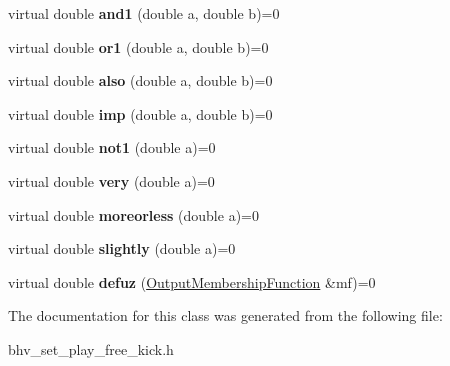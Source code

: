 \begin{DoxyCompactItemize}
\item 
\hypertarget{classOperatorset_a19f3335754a251731b307cd02f7c9a40}{
virtual double {\bfseries and1} (double a, double b)=0}
\label{classOperatorset_a19f3335754a251731b307cd02f7c9a40}

\item 
\hypertarget{classOperatorset_a6be260862b87a8bf9d11154bab210285}{
virtual double {\bfseries or1} (double a, double b)=0}
\label{classOperatorset_a6be260862b87a8bf9d11154bab210285}

\item 
\hypertarget{classOperatorset_abad32ecfd9b41e718e6724b42654cbd7}{
virtual double {\bfseries also} (double a, double b)=0}
\label{classOperatorset_abad32ecfd9b41e718e6724b42654cbd7}

\item 
\hypertarget{classOperatorset_a844267c0decdd4c40f653122aeedbf6c}{
virtual double {\bfseries imp} (double a, double b)=0}
\label{classOperatorset_a844267c0decdd4c40f653122aeedbf6c}

\item 
\hypertarget{classOperatorset_a5c0c6c2e91e36310213118e641e2752d}{
virtual double {\bfseries not1} (double a)=0}
\label{classOperatorset_a5c0c6c2e91e36310213118e641e2752d}

\item 
\hypertarget{classOperatorset_a9eb913329b3cec176b8f5105b823da86}{
virtual double {\bfseries very} (double a)=0}
\label{classOperatorset_a9eb913329b3cec176b8f5105b823da86}

\item 
\hypertarget{classOperatorset_aee3245e48931efd6ce85b01a491bc7f5}{
virtual double {\bfseries moreorless} (double a)=0}
\label{classOperatorset_aee3245e48931efd6ce85b01a491bc7f5}

\item 
\hypertarget{classOperatorset_a32953b7dbebb2a5dcf10c5e33f2ad75f}{
virtual double {\bfseries slightly} (double a)=0}
\label{classOperatorset_a32953b7dbebb2a5dcf10c5e33f2ad75f}

\item 
\hypertarget{classOperatorset_ac535dd16eef6c7baf68f265121d9c591}{
virtual double {\bfseries defuz} (\hyperlink{classOutputMembershipFunction}{OutputMembershipFunction} \&mf)=0}
\label{classOperatorset_ac535dd16eef6c7baf68f265121d9c591}

\end{DoxyCompactItemize}


The documentation for this class was generated from the following file:\begin{DoxyCompactItemize}
\item 
bhv\_\-set\_\-play\_\-free\_\-kick.h\end{DoxyCompactItemize}
